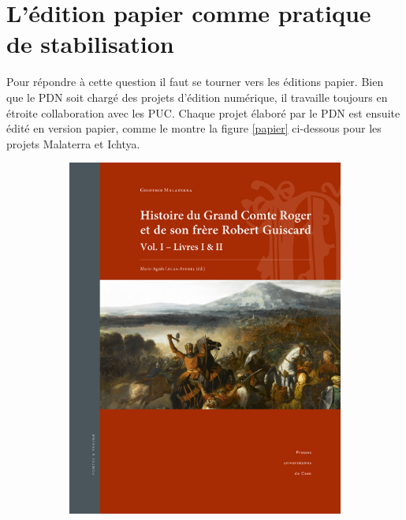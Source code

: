 \documentclass[a4paper,12pt,twoside]{book}
\begin{document}
\section{L'édition papier comme pratique de stabilisation}

Pour répondre à cette question il faut se tourner vers les éditions papier. Bien que le \acrshort{PDN} soit chargé des projets d'édition numérique, il travaille toujours en étroite collaboration avec les \acrshort{PUC}. Chaque projet élaboré par le \acrshort{PDN} est ensuite édité en version papier, comme le montre la figure \ref{papier} ci-dessous pour les projets Malaterra et Ichtya.

  \begin{figure}[H]
    \centering
    \begin{subfigure}[b]{0.3\linewidth}
      \includegraphics[width=\linewidth]{img/autre/couvMalaterra.jpg}
    \end{subfigure}
    \begin{subfigure}[b]{0.3\linewidth}

\end{subfigure}
\end{figure}
\end{document}
